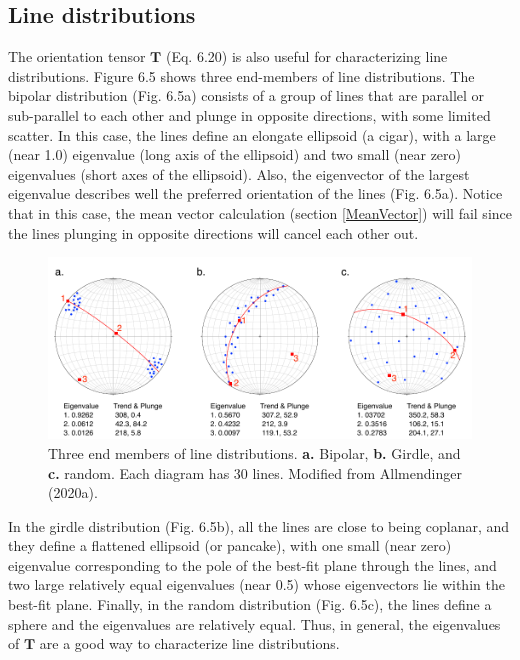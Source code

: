 \documentclass[a4paper , 12pt]{book}
\begin{document}
\subsection{Line distributions}

The orientation tensor $\mathbf{T}$ (Eq. 6.20) is also useful for characterizing line distributions. Figure 6.5 shows three end-members of line distributions. The bipolar distribution (Fig. 6.5a) consists of a group of lines that are parallel or sub-parallel to each other and plunge in opposite directions, with some limited scatter. In this case, the lines define an elongate ellipsoid (a cigar), with a large (near 1.0) eigenvalue (long axis of the ellipsoid) and two small (near zero) eigenvalues (short axes of the ellipsoid). Also, the eigenvector of the largest eigenvalue describes well the preferred orientation of the lines (Fig. 6.5a). Notice that in this case, the mean vector calculation (section \ref{MeanVector}) will fail since the lines plunging in opposite directions will cancel each other out.

\begin{figure}[ht]
    \centering
    \includegraphics[width=14cm]{ch6f6.pdf}
    \caption{Three end members of line distributions. \textbf{a.} Bipolar, \textbf{b.} Girdle, and \textbf{c.} random. Each diagram has 30 lines. Modified from Allmendinger (2020a).}
\end{figure}

In the girdle distribution (Fig. 6.5b), all the lines are close to being coplanar, and they define a flattened ellipsoid (or pancake), with one small (near zero) eigenvalue corresponding to the pole of the best-fit plane through the lines, and two large relatively equal eigenvalues (near 0.5) whose eigenvectors lie within the best-fit plane. Finally, in the random distribution (Fig. 6.5c), the lines define a sphere and the eigenvalues are relatively equal. Thus, in general, the eigenvalues of $\mathbf{T}$ are a good way to characterize line distributions.
\end{document}
